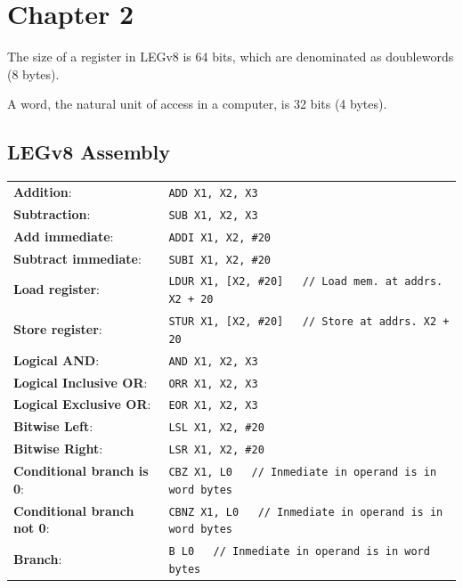 \documentclass[11pt]{article}
\begin{document}
\pagebreak

\section*{Chapter 2}

The size of a register in LEGv8 is 64 bits, which are denominated as doublewords (8 bytes).

A word, the natural unit of access in a computer, is 32 bits (4 bytes).

\subsection*{LEGv8 Assembly}

\begin{tcolorbox}[
    enhanced,
    attach boxed title to top left={xshift=6mm,yshift=-1.5mm},
    colback=moonstoneblue!20,
    colframe=moonstoneblue,
    colbacktitle=moonstoneblue,
    title=Relevant LEGv8 instructions,
    fonttitle=\bfseries\color{white},
    boxed title style={size=small,colframe=moonstoneblue,sharp corners},
    sharp corners,
]
    \begin{tabular}{@{} l @{\quad} l @{}}
    {\color{moondark}\textbf{Addition}}:           & \texttt{ADD X1, X2, X3}     \\
    {\color{moondark}\textbf{Subtraction}}:        & \texttt{SUB X1, X2, X3}     \\
    {\color{moondark}\textbf{Add immediate}}:      & \texttt{ADDI X1, X2, \#20}  \\
    {\color{moondark}\textbf{Subtract immediate}}: & \texttt{SUBI X1, X2, \#20}  \\
    {\color{moondark}\textbf{Load register}}:      & \texttt{LDUR X1, [X2, \#20] \ \ // Load mem. at addrs. X2 + 20} \\
    {\color{moondark}\textbf{Store register}}:     & \texttt{STUR X1, [X2, \#20] \ \ // Store at addrs. X2 + 20} \\
    {\color{moondark}\textbf{Logical AND}}:        & \texttt{AND X1, X2, X3}  \\
    {\color{moondark}\textbf{Logical Inclusive OR}}: & \texttt{ORR X1, X2, X3}  \\
    {\color{moondark}\textbf{Logical Exclusive OR}}: & \texttt{EOR X1, X2, X3}  \\
    {\color{moondark}\textbf{Bitwise Left}}:       & \texttt{LSL X1, X2, \#20}  \\
    {\color{moondark}\textbf{Bitwise Right}}:      & \texttt{LSR X1, X2, \#20}  \\
    {\color{moondark}\textbf{Conditional branch is 0}}: & \texttt{CBZ X1, L0 \ \ // Inmediate in operand is in word bytes} \\
    {\color{moondark}\textbf{Conditional branch not 0}}: & \texttt{CBNZ X1, L0 \ \ // Inmediate in operand is in word bytes} \\
    {\color{moondark}\textbf{Branch}}:             & \texttt{B L0 \ \ // Inmediate in operand is in word bytes}
    \end{tabular}
\end{tcolorbox}
\end{document}
